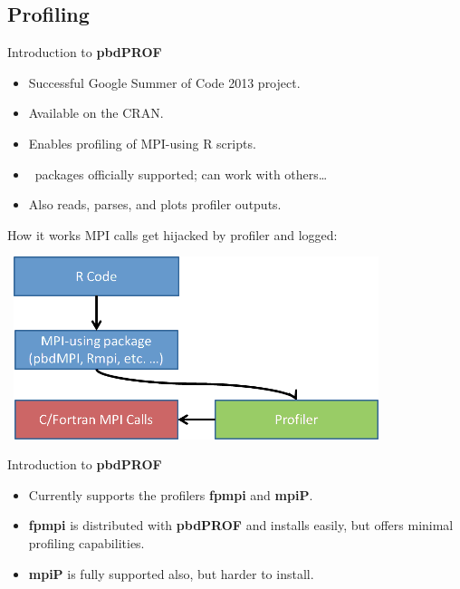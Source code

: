 \subsection{Profiling}


\begin{frame}
  \begin{block}{Introduction to \textbf{pbdPROF}}
    \begin{itemize}
      \item Successful Google Summer of Code 2013 project.
      \item Available on the CRAN.
      \item Enables profiling of MPI-using R scripts.
      \item \pbdR\ packages officially supported; can work with others\dots
      \item Also reads, parses, and plots profiler outputs.
    \end{itemize}
  \end{block}
\end{frame}


\begin{frame}
  \begin{block}{How it works}
  MPI calls get hijacked by profiler and logged:
	\begin{center}
	  \ \hspace{2cm}\includegraphics[width=0.8\textwidth]{../common/pics/prof/mpi_profiler}
	\end{center}
  \end{block}
\end{frame}


\begin{frame}
  \begin{block}{Introduction to \textbf{pbdPROF}}
    \begin{itemize}
      \item Currently supports the profilers \textbf{fpmpi} and \textbf{mpiP}.
      \item \textbf{fpmpi} is distributed with \textbf{pbdPROF} and installs easily, but offers 
minimal profiling capabilities.
      \item \textbf{mpiP} is fully supported also, but harder to install.
    \end{itemize}
  \end{block}
\end{frame}



